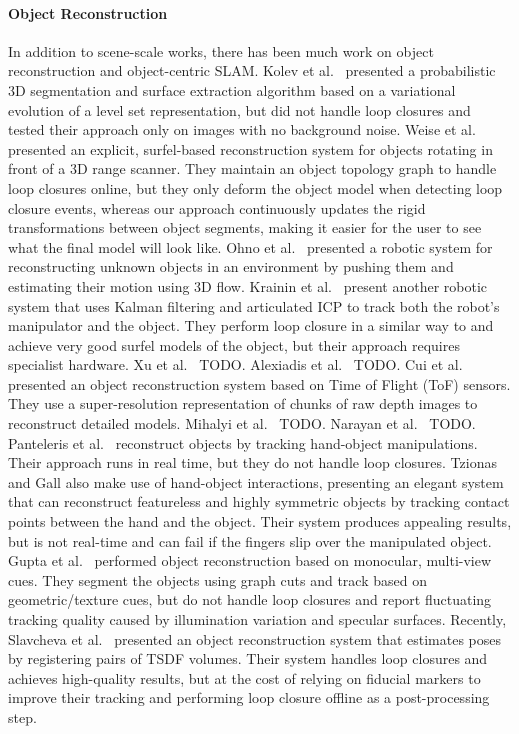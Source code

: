 \paragraph{Object Reconstruction}
In addition to scene-scale works, there has been much work on object reconstruction and object-centric SLAM. Kolev et al.\ \cite{Kolev2006} presented a probabilistic 3D segmentation and surface extraction algorithm based on a variational evolution of a level set representation, but did not handle loop closures and tested their approach only on images with no background noise. Weise et al.\ \cite{Weise2009} presented an explicit, surfel-based reconstruction system for objects rotating in front of a 3D range scanner. They maintain an object topology graph to handle loop closures online, but they only deform the object model when detecting loop closure events, whereas our approach continuously updates the rigid transformations between object segments, making it easier for the user to see what the final model will look like. Ohno et al.\ \cite{Ohno2011} presented a robotic system for reconstructing unknown objects in an environment by pushing them and estimating their motion using 3D flow. Krainin et al.\ \cite{Krainin2011IJRR} present another robotic system that uses Kalman filtering and articulated ICP to track both the robot's manipulator and the object. They perform loop closure in a similar way to \cite{Weise2009} and achieve very good surfel models of the object, but their approach requires specialist hardware. Xu et al.\ \cite{Xu2012} TODO. Alexiadis et al.\ \cite{Alexiadis2013} TODO. Cui et al.\ \cite{Cui2013} presented an object reconstruction system based on Time of Flight (ToF) sensors. They use a super-resolution representation of chunks of raw depth images to reconstruct detailed models. Mihalyi et al.\ \cite{Mihalyi2015} TODO. Narayan et al.\ \cite{Narayan2015} TODO. Panteleris et al.\ \cite{Pantaleris2015, Panteleris2015b} reconstruct objects by tracking hand-object manipulations. Their approach runs in real time, but they do not handle loop closures. Tzionas and Gall \cite{Tzionas2015} also make use of hand-object interactions, presenting an elegant system that can reconstruct featureless and highly symmetric objects by tracking contact points between the hand and the object. Their system produces appealing results, but is not real-time and can fail if the fingers slip over the manipulated object. Gupta et al.\ \cite{Gupta2016} performed object reconstruction based on monocular, multi-view cues. They segment the objects using graph cuts and track based on geometric/texture cues, but do not handle loop closures and report fluctuating tracking quality caused by illumination variation and specular surfaces. Recently, Slavcheva et al.\ \cite{slavcheva2016eccv} presented an object reconstruction system that estimates poses by registering pairs of TSDF volumes. Their system handles loop closures and achieves high-quality results, but at the cost of relying on fiducial markers to improve their tracking and performing loop closure offline as a post-processing step.

